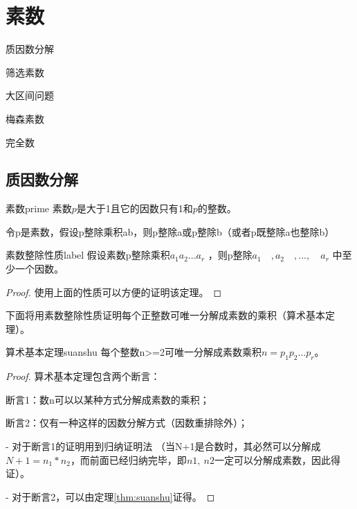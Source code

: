 \chapter{素数}
\begin{introduction}[本章内容提要]
	\item 质因数分解
	\item 筛选素数
	\item 大区间问题
	\item 梅森素数
	\item 完全数
\end{introduction}

\section{质因数分解}
\begin{definition}{素数}{prime}
	素数$p$是大于1且它的因数只有1和$p$的整数。
\end{definition}

\begin{property}
	令p是素数，假设p整除乘积ab，则p整除a或p整除b（或者p既整除a也整除b）  
\end{property}

\begin{theorem}{素数整除性质}{label}
假设素数p整除乘积$a_1a_2...a_r$ ，则p整除$a_1 \quad ,a_2 \quad , ...,\quad a_r$ 中至少一个因数。
\end{theorem}

\begin{proof}
	使用上面的性质可以方便的证明该定理。
\end{proof}

\vbox{}

下面将用{\heiti 素数整除性质}证明每个正整数可唯一分解成素数的乘积（算术基本定理）。

\begin{theorem}{算术基本定理}{suanshu}
	每个整数n>=2可唯一分解成素数乘积$n=p_1p_2...p_r$。
\end{theorem}

\begin{proof}
算术基本定理包含两个断言：

断言1：数n可以以某种方式分解成素数的乘积；

断言2：仅有一种这样的因数分解方式（因数重排除外）；

- 对于断言1的证明用到归纳证明法 （当N+1是合数时，其必然可以分解成$N+1=n_1*n_2$，而前面已经归纳完毕，即$n1,\ n2$一定可以分解成素数，因此得证）。

- 对于断言2，可以由定理\ref{thm:suanshu}证得。
\end{proof}

